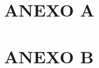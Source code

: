 \clearpage
\vspace*{\fill}
\section*{\centering ANEXO A}
\vspace*{\fill}
\clearpage
\newpage


\clearpage


\clearpage
\vspace*{\fill}
\section*{\centering ANEXO B}
\vspace*{\fill}
\clearpage
\newpage



\vspace*{\fill}
\begin{center}
\end{center}
\vspace*{\fill}
